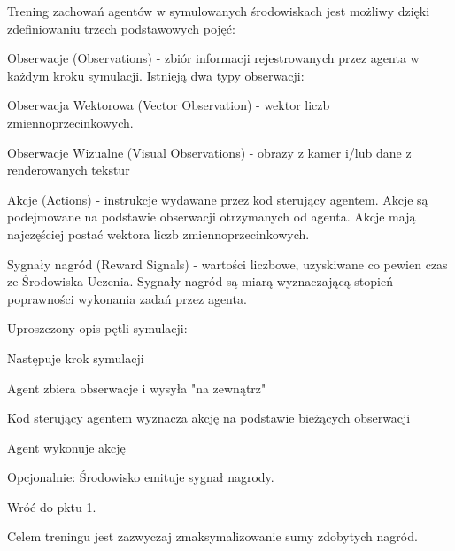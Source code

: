 \vspace{1cm}
Trening zachowań agentów w symulowanych środowiskach jest możliwy dzięki zdefiniowaniu trzech podstawowych pojęć:
\begin{enumerate*}
\item Obserwacje (Observations) - zbiór informacji rejestrowanych przez agenta w każdym kroku symulacji. 
Istnieją dwa typy obserwacji:
\begin{itemize*}
\item Obserwacja Wektorowa (Vector Observation) - wektor liczb zmiennoprzecinkowych.
\item Obserwacje Wizualne (Visual Observations) - obrazy z kamer i/lub dane z renderowanych tekstur
\end{itemize*}
\item Akcje (Actions) - instrukcje wydawane przez kod sterujący agentem. Akcje są podejmowane na podstawie obserwacji otrzymanych od agenta. Akcje mają najczęściej postać wektora liczb zmiennoprzecinkowych.
\item Sygnały nagród (Reward Signals) - wartości liczbowe, uzyskiwane co pewien czas ze Środowiska Uczenia. Sygnały nagród są miarą wyznaczającą stopień poprawności wykonania zadań przez agenta.
\end{enumerate*}

Uproszczony opis pętli symulacji:
\begin{enumerate*}
\item Następuje krok symulacji
\item Agent zbiera obserwacje i wysyła "na zewnątrz"
\item Kod sterujący agentem wyznacza akcję na podstawie bieżących obserwacji
\item Agent wykonuje akcję
\item Opcjonalnie: Środowisko emituje sygnał nagrody.
\item Wróć do pktu 1.
\end{enumerate*}
Celem treningu jest zazwyczaj zmaksymalizowanie sumy zdobytych nagród.

